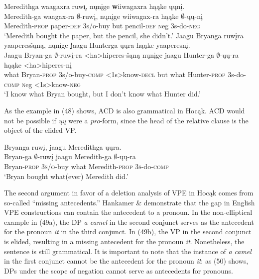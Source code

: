 \documentclass[output=paper]{LSP/langsci}
\begin{document}
\begin{exe}
\ex
\begin{xlist}
\ex
\glll Meredithga waagaxra ruw\k{\i}, nųnįge {\textbf wiiwagaxra} hąąke ųųnį.\\
Meredith-ga waagax-ra $\emptyset$-ruwį, nųnįge wiiwagax-ra hąąke $\emptyset$-ųų-nį\\
Meredith-\textsc{prop} paper-\textsc{def} {\textsc 3s/o}-buy but pencil-\textsc{def} {\textsc neg} {\textsc 3s}-do-\textsc{neg}\\
\trans `Meredith bought the paper, but the pencil, she didn't.'
\ex
\glll Jaagu Bryanga ruwįra yaaperesšąną, nųnįge {\textbf jaagu} Hunterga ųųra hąąke yaaperesnį.\\
Jaagu Bryan-ga $\emptyset$-ruwį-ra <ha>hiperes-šąną nųnįge jaagu Hunter-ga $\emptyset$-ųų-ra hąąke <ha>hiperes-nį\\
what Bryan-\textsc{prop} {\textsc 3s/o}-buy-\textsc{comp} <{\textsc 1s}>know-\textsc{decl} but what Hunter-\textsc{prop} {\textsc 3s}-do-\textsc{comp} {\textsc neg} <{\textsc 1s}>know-\textsc{neg}\\
\trans `I know what Bryan bought, but I don't know what Hunter did.'
\end{xlist}
\end{exe}

As the example in (48) shows, ACD is also grammatical in Hocąk. ACD would not be possible if \emph{ųų} were a \emph{pro}-form, since the head of the relative clause is the object of the elided VP.

\begin{exe}
\ex
\glll Bryanga ruwį, jaagu Meredithga ųųra.\\
Bryan-ga $\emptyset$-ruwį jaagu Meredith-ga $\emptyset$-ųų-ra\\
Bryan-\textsc{prop} \textsc{3s/o}-buy what Meredith-\textsc{prop} \textsc{3s}-do-\textsc{comp}\\
\trans `Bryan bought what(ever) Meredith did.'
\end{exe}

The second argument in favor of a deletion analysis of VPE in Hocąk comes from so-called ``missing antecedents.'' Hankamer \& \citet{Sag1976} demonstrate that the gap in English VPE constructions can contain the antecedent to a pronoun. In the non-elliptical example in (49a), the DP \emph{a camel} in the second conjunct serves as the antecedent for the pronoun \emph{it} in the third conjunct. In (49b), the VP in the second conjunct is elided, resulting in a missing antecedent for the pronoun \emph{it}. Nonetheless, the sentence is still grammatical. It is important to note that the instance of \emph{a camel} in the first conjunct cannot be the antecedent for the pronoun \emph{it}: as (50) shows, DPs under the scope of negation cannot serve as antecedents for pronouns.
\end{document}
